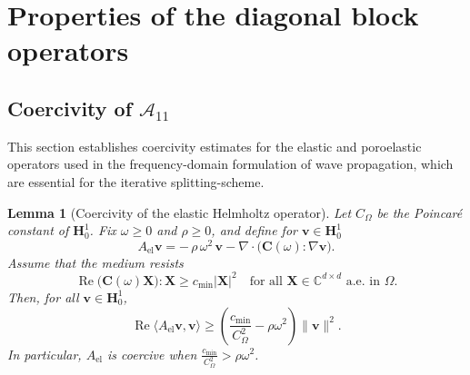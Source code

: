 \documentclass[pdflatex,sn-mathphys-num]{sn-jnl}
\theoremstyle{thmstyleone}%
\theoremstyle{thmstyletwo}%
\theoremstyle{thmstylethree}%
\def \calA {\mathcal{A}}
\newtheorem{lemma}[theorem]{Lemma}
\theoremstyle{definition}
\begin{document}
	
	

	
	\section{Properties of the diagonal block operators}\label{sec: appendix diagonal}
	
	
	
	
	
	
	
	
	
	
	\subsection{Coercivity of \texorpdfstring{$\calA_{11}$}{TEXT}}
	
	This section establishes coercivity estimates for the elastic and poroelastic operators used in the frequency-domain formulation of wave propagation, which are essential for the iterative splitting-scheme.
	
	\begin{lemma}[Coercivity of the elastic Helmholtz operator]
		Let $C_{\Omega}$ be the Poincaré constant of $\bm{H}_{0}^{1}$. 
		Fix $\omega \ge 0$ and $\rho \ge 0$, and define for $\mathbf{v} \in \bm{H}_{0}^{1}$
		\[
		A_{\mathrm{el}}\mathbf{v}
		= -\,\rho\,\omega^2\,\mathbf{v} 
		- \nabla \cdot \big(\mathbf{C}(\omega) : \nabla \mathbf{v}\big).
		\]
		Assume that the medium resists   
		\[
		\operatorname{Re}\big(\mathbf{C}(\omega)\mathbf{X}\big):\mathbf{X} \ge c_{\min} |\mathbf{X}|^2
		\quad \text{for all } \mathbf{X} \in \mathbb{C}^{d \times d} \text{ a.e. in } \Omega.
		\]
		Then, for all $\mathbf{v} \in \bm{H}_{0}^{1}$,
		\begin{equation}
			\operatorname{Re}\langle A_{\mathrm{el}}\mathbf{v}, \mathbf{v}\rangle 
			\ge \left( \frac{c_{\min}}{C_{\Omega}^2} - \rho \omega^2 \right) \|\mathbf{v}\|^2.
			\label{eq:elastic_coercivity_bound}
		\end{equation}
		In particular, $A_{\mathrm{el}}$ is coercive when
		$\frac{c_{\min}}{C_{\Omega}^2} > \rho \omega^2$.
	\end{lemma}
	
\end{document}
